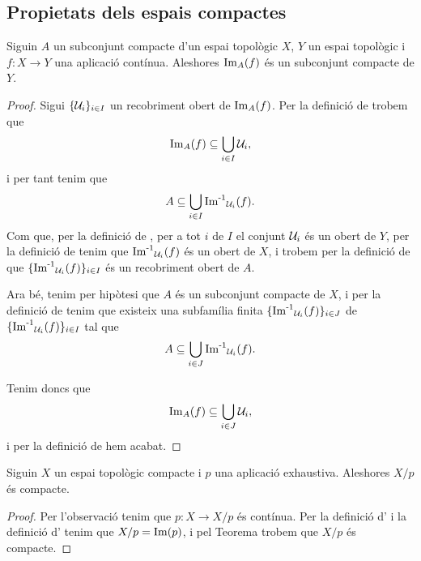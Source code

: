 \documentclass[../../Main.tex]{subfiles}
\begin{document}
	\subsection{Propietats dels espais compactes}
	\begin{theorem}
		\label{thm:la imatge d'un compacte per una aplicació contínua és un compacte}
		Siguin \(A\) un subconjunt compacte d'un espai topològic \(X\), \(Y\) un espai topològic i \(f\colon X\longrightarrow Y\) una aplicació contínua. Aleshores \(\operatorname{Im}_{A}(f)\) és un subconjunt compacte de \(Y\).
		\begin{proof} %
			Sigui \(\{\mathcal{U}_{i}\}_{i\in I}\) un recobriment obert de \(\operatorname{Im}_{A}(f)\). Per la definició de  trobem que
			\[
			    \operatorname{Im}_{A}(f)\subseteq\bigcup_{i\in I}\mathcal{U}_{i},
			\]
			i per tant tenim que
			\[
			    A\subseteq\bigcup_{i\in I}\operatorname{\operatorname{Im}^{-1}}_{\mathcal{U}_{i}}(f).
			\]
			Com que, per la definició de , per a tot \(i\) de \(I\) el conjunt \(\mathcal{U}_{i}\) és un obert de \(Y\), per la definició de  tenim que \(\operatorname{\operatorname{Im}^{-1}}_{\mathcal{U}_{i}}(f)\) és un obert de \(X\), i trobem per la definició de  que \(\{\operatorname{\operatorname{Im}^{-1}}_{\mathcal{U}_{i}}(f)\}_{i\in I}\) és un recobriment obert de \(A\).
			
			Ara bé, tenim per hipòtesi que \(A\) és un subconjunt compacte de \(X\), i per la definició de  tenim que existeix una subfamília finita \(\{\operatorname{\operatorname{Im}^{-1}}_{\mathcal{U}_{i}}(f)\}_{i\in J}\) de \(\{\operatorname{\operatorname{Im}^{-1}}_{\mathcal{U}_{i}}(f)\}_{i\in I}\) tal que
			\[
			    A\subseteq\bigcup_{i\in J}\operatorname{\operatorname{Im}^{-1}}_{\mathcal{U}_{i}}(f).
			\]
			
			Tenim doncs que
			\[
			    \operatorname{Im}_{A}(f)\subseteq\bigcup_{i\in J}\mathcal{U}_{i},
			\]
			i per la definició de  hem acabat.
		\end{proof}
	\end{theorem}
	\begin{corollary}
		\label{cor:el quocient d'un compacte és un compacte}
		Siguin \(X\) un espai topològic compacte i \(p\) una aplicació exhaustiva. Aleshores \(X/p\) és compacte.
		\begin{proof}
			Per l'observació  tenim que \(p\colon X\longrightarrow X/p\) és contínua. Per la definició d' i la definició d' tenim que \(X/p=\operatorname{Im}(p)\), i pel Teorema  trobem que \(X/p\) és compacte.
		\end{proof}
	\end{corollary}
\end{document}
